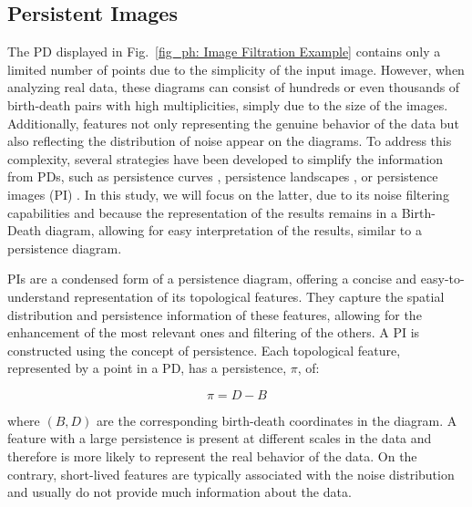 \documentclass[12pt]{mythesis}
\begin{document}
\subsection{Persistent Images}

The PD displayed in Fig.~\ref{fig_ph: Image Filtration Example} contains only a limited number of points due to the simplicity of the input image. However, when analyzing real data, these diagrams can consist of hundreds or even thousands of birth-death pairs with high multiplicities, simply due to the size of the images. Additionally, features not only representing the genuine behavior of the data but also reflecting the distribution of noise appear on the diagrams. To address this complexity, several strategies have been developed to simplify the information from PDs, such as persistence curves  \citep{persistence_curves}, persistence landscapes \citep{persistence_landscapes}, or persistence images (PI) \citep{persistence_images}. In this study, we will focus on the latter, due to its noise filtering capabilities and because the representation of the results remains in a Birth-Death diagram, allowing for easy interpretation of the results, similar to a persistence diagram.

PIs are a condensed form of a persistence diagram, offering a concise and easy-to-understand representation of its topological features.  They capture the spatial distribution and persistence information of these features, allowing for the enhancement of the most relevant ones and filtering of the others. A PI is constructed using the concept of persistence. Each topological feature, represented by a point in a PD, has a persistence, $\pi$, of:

\begin{equation}
    \pi = D - B
    \label{eq: persistence}
\end{equation}


where $(B, D)$ are the corresponding birth-death coordinates in the diagram. A feature with a large persistence is present at different scales in the data and therefore is more likely to represent the real behavior of the data. On the contrary, short-lived features are typically associated with the noise distribution and usually do not provide much information about the data.
\end{document}
